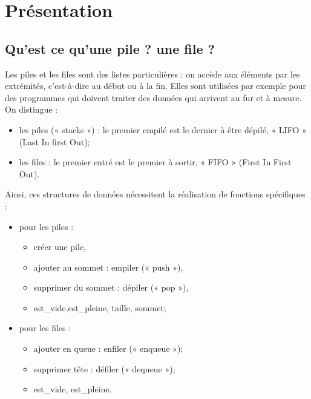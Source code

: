 \documentclass[10pt,fleqn]{article} %
\begin{document}


\section{Présentation}
\subsection{Qu'est ce qu'une pile ? une file ?}
Les piles et les files sont des listes particulières : on accède aux éléments par les extrémités, c'est-à-dire au début ou à la fin.
Elles sont utilisées par exemple pour des programmes qui doivent traiter des données qui arrivent au fur et à mesure.
On distingue :
\begin{itemize}[label=,font=\color{ocre}] 
\item les piles (« stacks ») : le premier empilé est le dernier à être dépilé, « LIFO » (Last In first Out);
\item les files : le premier entré est le premier à sortir, « FIFO » (First In First Out).
\end{itemize}\vspace{.25cm}
\noindent\begin{minipage}[c]{.53\linewidth}
\indent Ainsi, ces structures de données nécessitent la réalisation de fonctions spécifiques :
\begin{itemize}[label=,font=\color{ocre}] 
\item pour les piles :
\begin{itemize}[label=,font=\color{ocre}] 
\item créer une pile,
\item ajouter au sommet : empiler (« push »),
\item supprimer du sommet : dépiler (« pop »),
\item est\_vide,est\_pleine, taille, sommet;
\end{itemize} 
\item pour les files :
\begin{itemize}[label=,font=\color{ocre}] 
\item ajouter en queue : enfiler (« enqueue »);
\item supprimer tête : défiler (« dequeue »);
\item est\_vide, est\_pleine.
\end{itemize}
\end{itemize}
\end{minipage} \hfill
\end{document}
